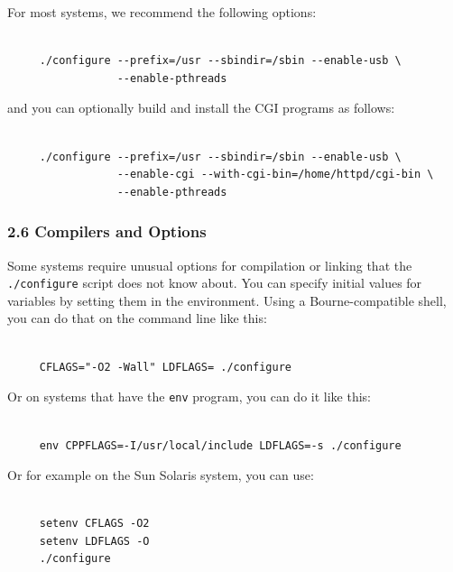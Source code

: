 For most systems, we recommend the following options: 

\footnotesize
\begin{verbatim}
     
     ./configure --prefix=/usr --sbindir=/sbin --enable-usb \
                 --enable-pthreads
\end{verbatim}
\normalsize

and you can optionally build and install the CGI programs as follows: 

\footnotesize
\begin{verbatim}
     
     ./configure --prefix=/usr --sbindir=/sbin --enable-usb \
                 --enable-cgi --with-cgi-bin=/home/httpd/cgi-bin \
                 --enable-pthreads
\end{verbatim}
\normalsize

\label{Compilers-and-Options}

\subsubsection*{2.6 Compilers and Options}
\index{Options!Compilers and }

\label{index-compiler-options-30}
Some systems require unusual options for compilation or linking that the {\tt
./configure} script does not know about. You can specify initial values for
variables by setting them in the environment. Using a Bourne-compatible shell,
you can do that on the command line like this: 

\footnotesize
\begin{verbatim}
     
     CFLAGS="-O2 -Wall" LDFLAGS= ./configure
\end{verbatim}
\normalsize

Or on systems that have the {\tt env} program, you can do it like this: 

\footnotesize
\begin{verbatim}
     
     env CPPFLAGS=-I/usr/local/include LDFLAGS=-s ./configure
\end{verbatim}
\normalsize

Or for example on the Sun Solaris system, you can use: 

\footnotesize
\begin{verbatim}
     
     setenv CFLAGS -O2
     setenv LDFLAGS -O
     ./configure
\end{verbatim}
\normalsize

